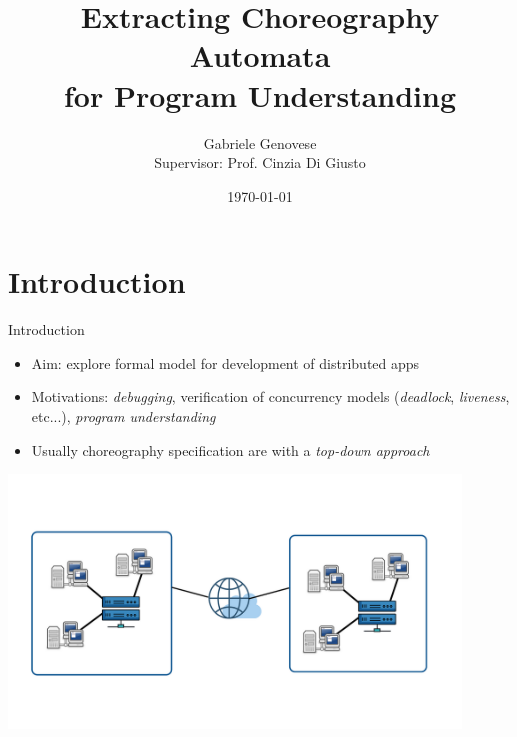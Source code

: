 \documentclass{beamer}
\title{Extracting Choreography Automata \\ for Program Understanding}
\author{Gabriele Genovese \\ Supervisor: Prof. Cinzia Di Giusto}
\date{\today}
\begin{document}
\frame{\titlepage}


\section{Introduction}
\begin{frame}{Introduction}
\begin{itemize}
    \item Aim: explore formal model for development of 
    distributed apps
    \item Motivations: \textit{debugging}, verification of 
    concurrency models (\textit{deadlock}, \textit{liveness}, etc...), 
    \textit{program understanding}
    \item Usually choreography specification are with a \textit{top-down approach}
\end{itemize}
\begin{center}
\includegraphics[width=0.9\textwidth]{images/dissys.png}
\end{center}
\end{frame}
\end{document}
